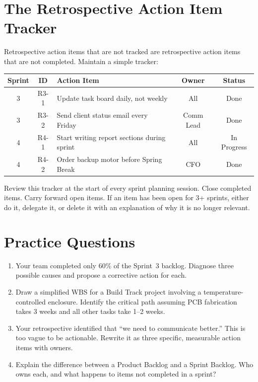\section{The Retrospective Action Item Tracker}
Retrospective action items that are not tracked are retrospective action items that are not completed. Maintain a simple tracker:

\begin{center}\small
\begin{tabularx}{\textwidth}{c c X c c}
\toprule
\textbf{Sprint} & \textbf{ID} & \textbf{Action Item} & \textbf{Owner} & \textbf{Status} \\
\midrule
3 & R3-1 & Update task board daily, not weekly & All & Done \\
3 & R3-2 & Send client status email every Friday & Comm Lead & Done \\
4 & R4-1 & Start writing report sections during sprint & All & In Progress \\
4 & R4-2 & Order backup motor before Spring Break & CFO & Done \\
\bottomrule
\end{tabularx}
\end{center}

Review this tracker at the start of every sprint planning session. Close completed items. Carry forward open items. If an item has been open for 3+ sprints, either do it, delegate it, or delete it with an explanation of why it is no longer relevant.


\section{Practice Questions}
\begin{enumerate}[leftmargin=1.5em]
\item Your team completed only 60\% of the Sprint~3 backlog. Diagnose three possible causes and propose a corrective action for each.
\item Draw a simplified WBS for a Build Track project involving a temperature-controlled enclosure. Identify the critical path assuming PCB fabrication takes 3 weeks and all other tasks take 1--2 weeks.
\item Your retrospective identified that ``we need to communicate better.'' This is too vague to be actionable. Rewrite it as three specific, measurable action items with owners.
\item Explain the difference between a Product Backlog and a Sprint Backlog. Who owns each, and what happens to items not completed in a sprint?
\end{enumerate}


